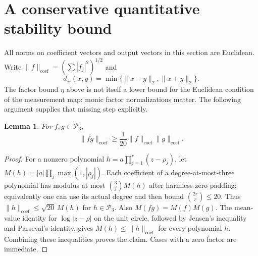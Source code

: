 \documentclass[11pt]{article}
\newtheorem{lemma}[theorem]{Lemma}
\theoremstyle{remark}\newtheorem{remark}[theorem]{Remark}
\newcommand{\coef}{\mathrm{coef}}
\begin{document}
\section{A conservative quantitative stability bound}
All norms on coefficient vectors and output vectors in this section are Euclidean. Write $\|f\|_{\coef}=(\sum|f_j|^2)^{1/2}$ and
\[
 d_{\pm}(x,y)=\min\{\|x-y\|_2,\|x+y\|_2\}.
\]
The factor bound $\eta$ above is not itself a lower bound for the Euclidean condition of the measurement map: monic factor normalizations matter. The following argument supplies that missing step explicitly.

\begin{lemma}\label{lem:mahler}
For $f,g\in\mathcal P_3$,
\[
 \|fg\|_{\coef}\ge\frac1{20}\|f\|_{\coef}\|g\|_{\coef}.
\]
\end{lemma}
\begin{proof}
For a nonzero polynomial $h=a\prod_{j=1}^{r}(z-\rho_j)$, let
$M(h)=|a|\prod_j\max(1,|\rho_j|)$. Each coefficient of a degree-at-most-three polynomial has modulus at most $\binom3j M(h)$ after harmless zero padding; equivalently one can use its actual degree and then bound $\binom{2r}{r}\le20$. Thus $\|h\|_{\coef}\le\sqrt{20}\,M(h)$ for $h\in\mathcal P_3$. Also $M(fg)=M(f)M(g)$. The mean-value identity for $\log|z-\rho|$ on the unit circle, followed by Jensen's inequality and Parseval's identity, gives $M(h)\le\|h\|_{\coef}$ for every polynomial $h$. Combining these inequalities proves the claim. Cases with a zero factor are immediate.
\end{proof}
\end{document}

